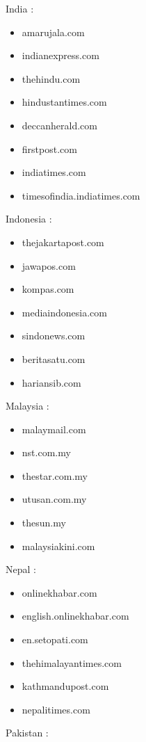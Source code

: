 \documentclass[
  letterpaper,
  DIV=11,
  numbers=noendperiod]{scrartcl}
\providecommand{\tightlist}{%
  \setlength{\itemsep}{0pt}\setlength{\parskip}{0pt}}\usepackage{longtable,booktabs,array}
\begin{document}
India :

\begin{itemize}
\tightlist
\item
  amarujala.com
\item
  indianexpress.com
\item
  thehindu.com
\item
  hindustantimes.com
\item
  deccanherald.com
\item
  firstpost.com
\item
  indiatimes.com
\item
  timesofindia.indiatimes.com
\end{itemize}

Indonesia :

\begin{itemize}
\tightlist
\item
  thejakartapost.com
\item
  jawapos.com
\item
  kompas.com
\item
  mediaindonesia.com
\item
  sindonews.com
\item
  beritasatu.com
\item
  hariansib.com
\end{itemize}

Malaysia :

\begin{itemize}
\tightlist
\item
  malaymail.com
\item
  nst.com.my
\item
  thestar.com.my
\item
  utusan.com.my
\item
  thesun.my
\item
  malaysiakini.com
\end{itemize}

Nepal :

\begin{itemize}
\tightlist
\item
  onlinekhabar.com
\item
  english.onlinekhabar.com
\item
  en.setopati.com
\item
  thehimalayantimes.com
\item
  kathmandupost.com
\item
  nepalitimes.com
\end{itemize}

Pakistan :
\end{document}
